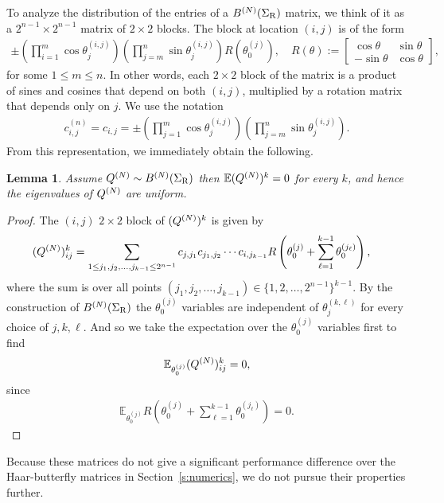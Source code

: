 \documentclass{amsart}
\newtheorem{lemma}[theorem]{Lemma}
\theoremstyle{definition}
\theoremstyle{remark}
\numberwithin{equation}{section}
\begin{document}
To analyze the distribution of the entries of a $B^{(N)}(\Sigma_{\mathrm{R}})$ matrix, we think of it as a $2^{n-1} \times 2^{n-1}$ matrix of $2\times 2$ blocks.  The block at location $(i,j)$ is of the form
\begin{align}
\pm \left(\prod_{i=1}^m \cos \theta_j^{(i,j)} \right) \left( \prod_{j=m}^{n} \sin \theta_j^{(i,j)}  \right) R(\theta_0^{(j)}), \quad R(\theta) := \begin{bmatrix}
\cos \theta & \sin \theta \\ - \sin \theta & \cos \theta
\end{bmatrix},
\end{align}
for some $1\leq m \leq n$.  In other words, each $2\times 2$ block of the matrix is a product of sines and cosines that depend on both $(i,j)$, multiplied by a rotation matrix that depends only on $j$.  We use the notation
\begin{align}\label{e:cij}
c^{(n)}_{i,j} = c_{i,j} = \pm \left(\prod_{j=1}^m \cos \theta_j^{(i,j)} \right) \left( \prod_{j=m}^{n} \sin \theta_j^{(i,j)}  \right).
\end{align}
From this representation, we immediately obtain the following.
\begin{lemma}
Assume $Q^{(N)} \sim B^{(N)}(\Sigma_{\mathrm{R}})$ then $\mathbb E ( Q^{(N)})^k = 0$ for every $k$, and hence the eigenvalues of $Q^{(N)}$ are uniform.
\end{lemma}
\begin{proof}
The $(i,j)$ $2 \times 2$ block of $( Q^{(N)})^k$ is given by
\begin{align}
( Q^{(N)})^k_{ij} &= \sum_{1 \leq j_1, j_2, \ldots, j_{k-1}\leq 2^{n-1}} c_{j,j_1} c_{j_1,j_2}\cdots c_{i,j_{k-1}} R\left(\theta_0^{(j)} + \sum_{\ell=1}^{k-1}\theta_0^{(j_\ell)}  \right),
\end{align}
where the sum is over all points $(j_1,j_2,\ldots,j_{k-1}) \in \{1,2,\ldots,2^{n-1}\}^{k-1}$.  By the construction of $B^{(N)}(\Sigma_{\mathrm{R}})$ the $\theta_0^{(j)}$ variables are independent of 
$\theta_j^{(k,\ell)}$ for every choice of $j,k,\ell$.  And so we take the expectation over the $\theta_0^{(j)}$ variables first to find
\begin{align}
\mathbb E_{\theta_0^{(j)}} ( Q^{(N)})^k_{ij} = 0,
\end{align}
since
\begin{align}
\mathbb E_{\theta_0^{(j)}} R\left(\theta_0^{(j)} + \sum_{\ell=1}^{k-1}\theta_0^{(j_\ell)}  \right) = 0.
\end{align}
\end{proof}
Because these matrices do not give a significant performance difference over the Haar-butterfly matrices in Section~\ref{s:numerics}, we do not pursue their properties further.
\end{document}
